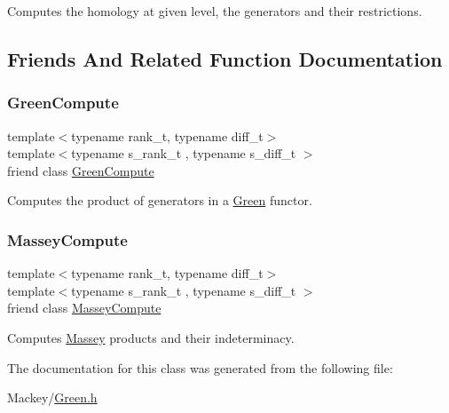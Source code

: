Computes the homology at given level, the generators and their restrictions. 

\subsection{Friends And Related Function Documentation}
\mbox{\label{classMackey_1_1internal_1_1ChainsLevelGen_a85de7c4aeeee34981e2020c2f9ddd3e2}} 
\subsubsection{\texorpdfstring{Green\+Compute}{GreenCompute}}
{\footnotesize\ttfamily template$<$typename rank\+\_\+t, typename diff\+\_\+t$>$ \\
template$<$typename s\+\_\+rank\+\_\+t , typename s\+\_\+diff\+\_\+t $>$ \\
friend class \hyperlink{classMackey_1_1internal_1_1GreenCompute}{Green\+Compute}\hspace{0.3cm}{\ttfamily [friend]}}



Computes the product of generators in a \hyperlink{classMackey_1_1Green}{Green} functor. 

\mbox{\label{classMackey_1_1internal_1_1ChainsLevelGen_af259bfb9b4dced17104ac8fbb697355c}} 
\subsubsection{\texorpdfstring{Massey\+Compute}{MasseyCompute}}
{\footnotesize\ttfamily template$<$typename rank\+\_\+t, typename diff\+\_\+t$>$ \\
template$<$typename s\+\_\+rank\+\_\+t , typename s\+\_\+diff\+\_\+t $>$ \\
friend class \hyperlink{classMackey_1_1internal_1_1MasseyCompute}{Massey\+Compute}\hspace{0.3cm}{\ttfamily [friend]}}



Computes \hyperlink{classMackey_1_1Massey}{Massey} products and their indeterminacy. 



The documentation for this class was generated from the following file\+:\begin{DoxyCompactItemize}
\item 
Mackey/\hyperlink{Green_8h}{Green.\+h}\end{DoxyCompactItemize}
